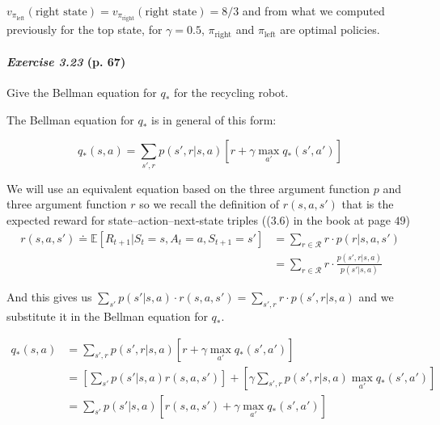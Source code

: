 \documentclass[10pt,a4paper]{article}
\begin{document}
$v_{\pi_\textrm{left}}(\textrm{right state}) = v_{\pi_\textrm{right}}(\textrm{right state})= 8/3$ and from what we computed previously for the top state, for $\gamma=0.5$,  $\pi_\textrm{right}$ and $\pi_\textrm{left}$ are optimal policies.


\paragraph{\textit{Exercise 3.23} (p. 67)} Give the Bellman equation for $q_*$ for the recycling robot.

\bigskip
The Bellman equation for $q_*$ is in general of this form:

\begin{equation}
q_*(s, a) = \sum_{s', r} p(s', r \lvert s, a) \left[r + \gamma \max_{a'} q_*(s', a')\right]
\end{equation}

We will use an equivalent equation based on the three argument function $p$ and three argument function $r$ so we recall the definition of $r(s, a, s')$ that is the expected reward for state--action--next-state triples (($3.6$) in the book at page $49$)
\begin{equation}
\begin{split}
r(s, a, s') \doteq \mathbb{E}[R_{t+1} \lvert S_t = s, A_t = a, S_{t+1} = s'] &= \sum_{r \in \mathcal{R}} r \cdot p(r \lvert s, a, s')\\
&= \sum_{r \in \mathcal{R}} r \cdot \frac{p(s', r \lvert s, a)}{p(s' \lvert s, a)}
\end{split}
\end{equation}

And this gives us $\sum_{s'} p(s' \lvert s, a) \cdot r(s, a, s') = \sum_{s', r} r \cdot p(s', r \lvert s, a)$ and we substitute it in the Bellman equation for $q_*$.

\begin{equation}
\begin{split}
q_*(s, a) &= \sum_{s', r} p(s', r \lvert s, a) \left[r + \gamma \max_{a'} q_*(s', a')\right]\\
&= \left[\sum_{s'} p(s' \lvert s, a) r(s, a, s')\right] + \left[\gamma \sum_{s', r} p(s', r \lvert s, a) \max_{a'} q_*(s', a')\right]\\
&= \sum_{s'} p(s' \lvert s, a) \left[r(s, a, s') + \gamma \max_{a'} q_*(s', a')\right]\\
\end{split}
\end{equation}
\end{document}
